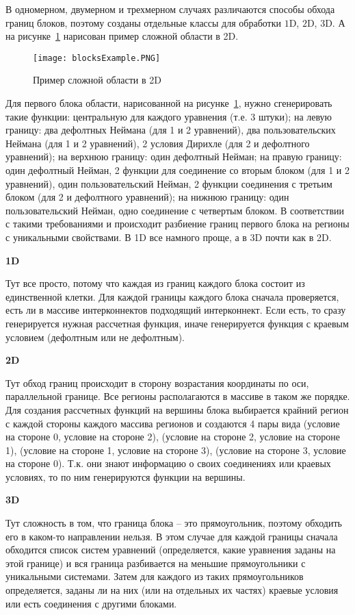\documentclass[a4paper]{article}
\begin{document}
В одномерном, двумерном и трехмерном случаях различаются способы обхода границ блоков, поэтому созданы отдельные классы для обработки $1$D, $2$D, $3$D. А на рисунке~\ref{pict1} нарисован пример сложной области в 2D.

\begin{figure}[h!]
\centering
\texttt{[image: blocksExample.PNG]}
\caption{Пример сложной области в 2D}\label{pict1}
\end{figure}

Для первого блока области, нарисованной на рисунке~\ref{pict1}, нужно сгенерировать такие функции: центральную для каждого уравнения (т.е. 3 штуки); на левую гра\-ни\-цу: два дефолтных Неймана (для 1 и 2 уравнений), два пользовательских Неймана (для 1 и 2 уравнений), 2 условия Дирихле (для 2 и дефолтного уравнений); на верхнюю границу: один дефолтный Нейман; на правую границу: один дефолтный Нейман, 2 функции для соединение со вторым блоком (для 1 и 2 уравнений), один пользовательский Нейман, 2 функции соединения с  третьим блоком (для 2 и де\-фолт\-но\-го уравнений); на нижнюю границу: один пользовательский Нейман, одно соединение с четвертым блоком. В соответствии с такими требованиями и происходит разбиение границ первого блока на регионы с уникальными свойствами. В 1D все намного проще, а в 3D почти как в 2D.

{\bf 1D}

Тут все просто, потому что каждая из границ каждого блока состоит из един\-ствен\-ной клетки. Для каждой границы каждого блока сначала проверяется, есть ли в массиве интерконнектов подходящий интерконнект. Если есть, то сразу генерируется нужная рассчетная функция, иначе генерируется функция с краевым условием (де\-фолт\-ным или не дефолтным).

{\bf 2D}

Тут обход границ происходит в сторону возрастания координаты по оси, па\-рал\-лель\-ной границе. Все регионы располагаются в массиве в таком же порядке. Для создания рассчетных функций на вершины блока выбирается крайний регион с каж\-дой стороны каждого массива регионов и создаются 4 пары вида (условие на стороне 0, условие на стороне 2), (условие на стороне 2, условие на стороне 1), (условие на стороне 1, условие на стороне 3), (условие на стороне 3, условие на стороне 0). Т.к. они знают информацию о своих соединениях или краевых условиях, то по ним генерируются функции на вершины.

{\bf 3D}

Тут сложность в том, что граница блока -- это прямоугольник, поэтому обходить его в каком-то направлении нельзя. В этом случае для каждой границы сначала обходится список систем уравнений (определяется, какие уравнения заданы на этой границе) и вся граница разбивается на меньшие прямоугольники с уникальными системами. Затем для каждого из таких прямоугольников определяется, заданы ли на них (или на отдельных их частях) краевые условия или есть соединения с другими блоками.
\end{document}
